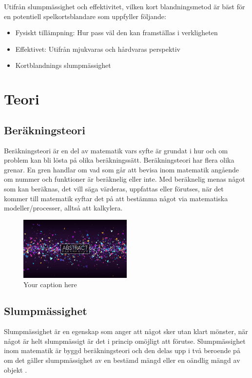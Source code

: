 \documentclass[swedish,a4paper]{article}
\begin{document}
Utifrån slumpmässighet och effektivitet, vilken kort blandningsmetod är bäst för
en potentiell spelkortsblandare som uppfyller följande:
\begin{itemize}
	\item Fysiskt tillämpning: Hur pass väl den kan framställas i verkligheten 
	\item Effektivet: Utifrån mjukvaras och hårdvaras perspektiv
        \item Kortblandnings slumpmässighet
\end{itemize}
\section{Teori}
\subsection{Beräkningsteori}

Beräkningsteori är en del av matematik vars syfte är grundat i hur och om
problem kan bli lösta på olika beräkningssätt. Beräkningsteori har flera olika
grenar. En gren handlar om vad som går att bevisa inom matematik angående om
nummer och funktioner är beräknelig eller inte. Med beräknelig menas något som
kan beräknas, det vill säga värderas, uppfattas eller förutses, när det kommer
till matematik syftar det på att bestämma något via matematiska
modeller/processer, alltså att kalkylera.

\begin{figure}[h]
  \centering
  \includegraphics[width=0.5\textwidth]{images/test.jpg}
  \caption{Your caption here}
  \label{fig: a very cool test image}
\end{figure}

\subsection{Slumpmässighet}

Slumpmässighet är en egenskap som anger att något sker utan klart mönster, när
något är helt slumpmässigt är det i princip omöjligt att förutse. Slumpmässighet
inom matematik är byggd beräknings\-teori och den delas upp i två beroende på om
det gäller slumpmässighet av en bestämd mängd eller en oändlig mängd av objekt
\parencite{Terwijn2016}.
\end{document}
